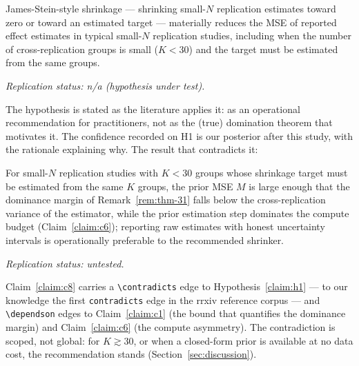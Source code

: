 \documentclass{rrxiv}
\begin{document}
\begin{claim}[title=H1 (the tested hypothesis), type=empirical, evidence=argument, confidence=0.1, rationale={the standing recommendation of the methodological literature since the Efron-Morris era; its theoretical support (JS dominance) is real but this paper's Claim 8 contradicts its operational content in the small-K data-estimated-prior regime}, regimes={small-N replication, K < 30, target estimated from the same K groups}, labels={hypothesis-under-test}]
\label{claim:h1}
James-Stein-style shrinkage --- shrinking small-$N$ replication estimates
toward zero or toward an estimated target --- materially reduces the MSE
of reported effect estimates in typical small-$N$ replication studies,
including when the number of cross-replication groups is small ($K < 30$)
and the target must be estimated from the same groups.

\emph{Replication status: n/a (hypothesis under test).}
\end{claim}

The hypothesis is stated as the literature applies it: as an operational
recommendation for practitioners, not as the (true) domination theorem
that motivates it. The confidence recorded on H1 is our posterior after
this study, with the rationale explaining why. The result that
contradicts it:

\begin{claim}[title=Claim 8 (the negative result), type=empirical, evidence=simulation, confidence=0.8, rationale={three simulation benchmarks and one multi-task regression study, one simulation design per benchmark; the K threshold of roughly 30 is an empirical cut observed in these designs, not a proven constant; no independent replication yet}, regimes={small-N replication, K < 30, target estimated from the same K groups}, labels={negative-result}]
\label{claim:c8}
For small-$N$ replication studies with $K < 30$ groups whose shrinkage
target must be estimated from the same $K$ groups, the prior MSE $M$ is
large enough that the dominance margin of Remark~\ref{rem:thm-31} falls
below the cross-replication variance of the estimator, while the prior
estimation step dominates the compute budget
(Claim~\ref{claim:c6}); reporting raw estimates with honest uncertainty
intervals is operationally preferable to the recommended shrinker.

\emph{Replication status: untested.}
\end{claim}

Claim~\ref{claim:c8} carries a \texttt{\textbackslash contradicts} edge
to Hypothesis~\ref{claim:h1} --- to our knowledge the first
\texttt{contradicts} edge in the rrxiv reference corpus --- and
\texttt{\textbackslash dependson} edges to Claim~\ref{claim:c1} (the
bound that quantifies the dominance margin) and Claim~\ref{claim:c6}
(the compute asymmetry). The contradiction is scoped, not global: for
$K \gtrsim 30$, or when a closed-form prior is available at no data
cost, the recommendation stands (Section~\ref{sec:discussion}).
\end{document}
